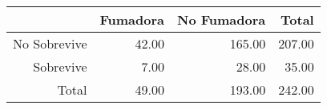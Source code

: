\begin{table}[ht]
\centering
\begin{tabular}{rrrr}
  \hline
 & Fumadora & No Fumadora & Total \\ 
  \hline
No Sobrevive & 42.00 & 165.00 & 207.00 \\ 
  Sobrevive & 7.00 & 28.00 & 35.00 \\ 
  Total & 49.00 & 193.00 & 242.00 \\ 
   \hline
\end{tabular}
\end{table}
